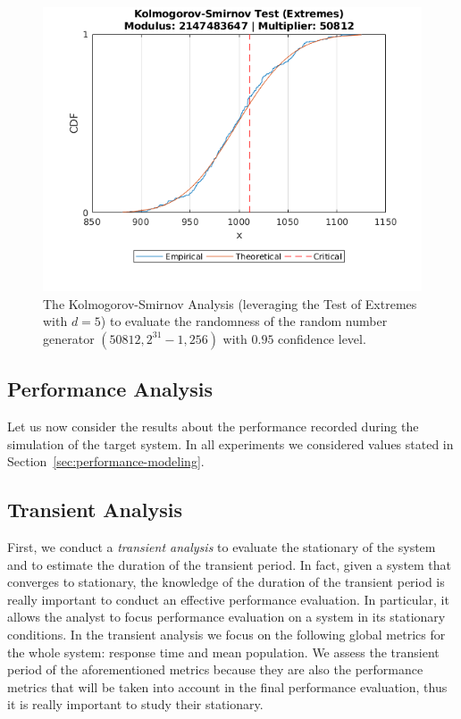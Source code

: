 \begin{figure}
	\includegraphics[width=\columnwidth]{fig/evaluation-randomness-kolmogorov-smirnov-50812}
	\caption{The Kolmogorov-Smirnov Analysis (leveraging the Test of Extremes with $d=5$) to evaluate the randomness of the random number generator $(50812,2^{31}-1, 256)$ with $0.95$ confidence level.}
	\label{fig:evaluation-randomness-kolmogorov-smirnov-50812}
\end{figure}


\subsection{Performance Analysis}
Let us now consider the results about the performance recorded during the simulation of the target system.
In all experiments we considered values stated in Section~\ref{sec:performance-modeling}.

\subsection{Transient Analysis}
\label{sec:evaluation-transient-analysis}
First, we conduct a \textit{transient analysis} to evaluate the stationary of the system and to estimate the duration of the transient period.
%
In fact, given a system that converges to stationary, the knowledge of the duration of the transient period is really important to conduct an effective performance evaluation. In particular, it allows the analyst to focus performance evaluation on a system in its stationary conditions.
%
In the transient analysis we focus on the following global metrics for the whole system: response time and mean population.
%
We assess the transient period of the aforementioned metrics because they are also the performance metrics that will be taken into account in the final performance evaluation, thus it is really important to study their stationary.

